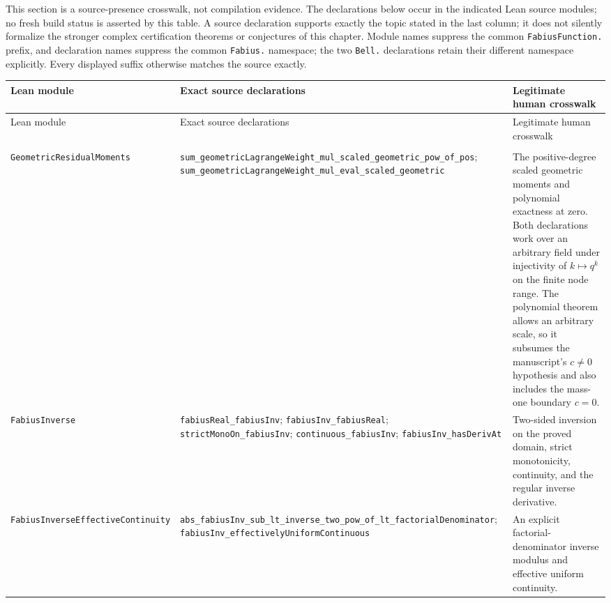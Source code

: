 This section is a source-presence crosswalk, not compilation evidence.  The
declarations below occur in the indicated Lean source modules; no fresh build
status is asserted by this table.  A source declaration supports exactly the
topic stated in the last column; it does not silently formalize the stronger
complex certification theorems or conjectures of this chapter.  Module names
suppress the common
\nolinkurl{FabiusFunction.} prefix, and declaration names suppress the common
\nolinkurl{Fabius.} namespace; the two \nolinkurl{Bell.} declarations retain
their different namespace explicitly.  Every displayed suffix otherwise
matches the source exactly.

\begingroup
\small
\setlength{\tabcolsep}{4pt}
\renewcommand{\arraystretch}{1.18}
\begin{longtable}{@{}>{\raggedright\arraybackslash}p{}>{\raggedright\arraybackslash}p{}>{\raggedright\arraybackslash}p{}@{}}
\toprule
Lean module & Exact source declarations & Legitimate human crosswalk \\
\midrule
\endfirsthead
\toprule
Lean module & Exact source declarations & Legitimate human crosswalk \\
\midrule
\endhead
\midrule
\multicolumn{3}{r@{}}{\small\itshape Continued on the next page}\\
\endfoot
\bottomrule
\endlastfoot
\nolinkurl{GeometricResidualMoments}
&
\nolinkurl{sum_geometricLagrangeWeight_mul_scaled_geometric_pow_of_pos};
\nolinkurl{sum_geometricLagrangeWeight_mul_eval_scaled_geometric}
&
The positive-degree scaled geometric moments and polynomial exactness at zero.
Both declarations work over an arbitrary field under injectivity of
\(k\mapsto q^k\) on the finite node range.  The polynomial theorem allows an
arbitrary scale, so it subsumes the manuscript's \(c\ne0\) hypothesis and also
includes the mass-one boundary \(c=0\). \\

\nolinkurl{FabiusInverse}
&
\nolinkurl{fabiusReal_fabiusInv};
\nolinkurl{fabiusInv_fabiusReal};
\nolinkurl{strictMonoOn_fabiusInv};
\nolinkurl{continuous_fabiusInv};
\nolinkurl{fabiusInv_hasDerivAt}
&
Two-sided inversion on the proved domain, strict monotonicity, continuity,
and the regular inverse derivative. \\

\nolinkurl{FabiusInverseEffectiveContinuity}
&
\nolinkurl{abs_fabiusInv_sub_lt_inverse_two_pow_of_lt_factorialDenominator};
\nolinkurl{fabiusInv_effectivelyUniformContinuous}
&
An explicit factorial-denominator inverse modulus and effective uniform
continuity. \\


\end{longtable}
